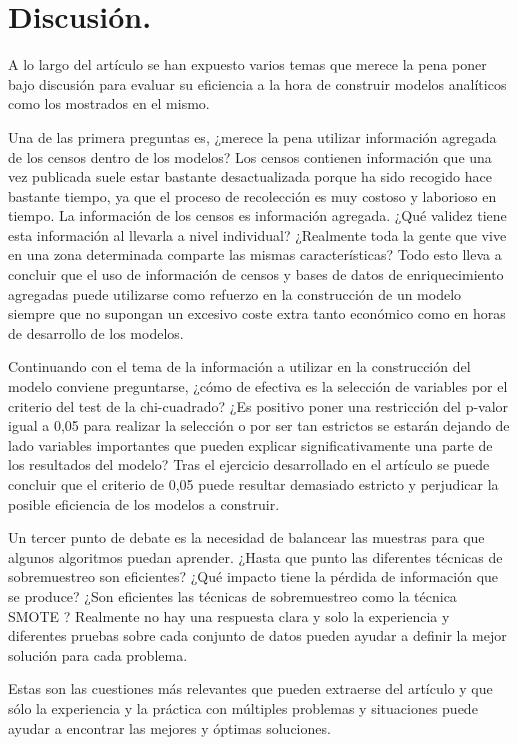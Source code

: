 \section{Discusión.}

A lo largo del artículo se han expuesto varios temas que merece la pena poner bajo discusión para evaluar su eficiencia a la hora de construir modelos analíticos como los mostrados en el mismo.

Una de las primera preguntas es, ¿merece la pena utilizar información agregada de los censos dentro de los modelos? Los censos contienen información que una vez publicada suele estar bastante desactualizada porque ha sido recogido hace bastante tiempo, ya que el proceso de recolección es muy costoso y laborioso en tiempo. La información de los censos es información agregada. ¿Qué validez tiene esta información al llevarla a nivel individual? ¿Realmente toda la gente que vive en una zona determinada comparte las mismas características? Todo esto lleva a concluir que el uso de información de censos y bases de datos de enriquecimiento agregadas puede utilizarse como refuerzo en la construcción de un modelo siempre que no supongan un excesivo coste extra tanto económico como en horas de desarrollo de los modelos.

Continuando con el tema de la información a utilizar en la construcción del modelo conviene preguntarse, ¿cómo de efectiva es la selección de variables por el criterio del test de la chi-cuadrado? ¿Es positivo poner una restricción del p-valor igual a 0,05 para realizar la selección o por ser tan estrictos se estarán dejando de lado variables importantes que pueden explicar significativamente una parte de los resultados del modelo? Tras el ejercicio desarrollado en el artículo se puede concluir que el criterio de 0,05 puede resultar demasiado estricto y perjudicar la posible eficiencia de los modelos a construir.

Un tercer punto de debate es la necesidad de balancear las muestras para que algunos algoritmos puedan aprender. ¿Hasta que punto las diferentes técnicas de sobremuestreo son eficientes? ¿Qué impacto tiene la pérdida de información que se produce? ¿Son eficientes las técnicas de sobremuestreo como la técnica SMOTE \cite{SMOTE}? Realmente no hay una respuesta clara y solo la experiencia y diferentes pruebas sobre cada conjunto de datos pueden ayudar a definir la mejor solución para cada problema.

Estas son las cuestiones más relevantes que pueden extraerse del artículo y que sólo la experiencia y la práctica con múltiples problemas y situaciones puede ayudar a encontrar las mejores y óptimas soluciones.


